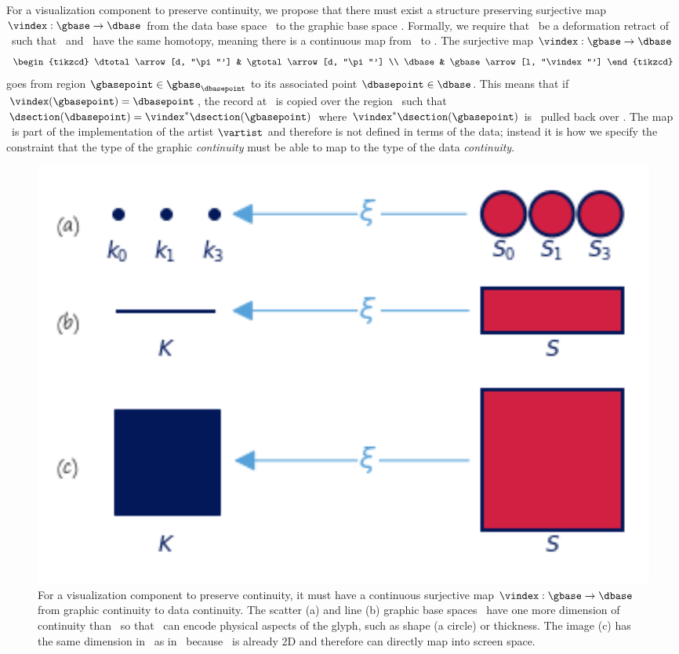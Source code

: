 \documentclass[../main.tex]{subfiles}
\begin{document}
For a visualization component to preserve continuity, we propose that there must exist a structure preserving surjective map \(\vindex: \gbase\rightarrow\dbase\) from the data base space \dbase\ to the graphic base space \gbase. Formally, we require that \dbase\ be a deformation retract \cite{RetractionTopology2020} of \gbase\ such that \dbase\ and \gbase\ have the same homotopy, meaning there is a continuous map from \gbase\ to \dbase \cite{weissteinHomotopy}. The surjective map \(\vindex: \gbase \rightarrow \dbase\)
\begin{equation}
    \begin{tikzcd}
        \dtotal \arrow[d, "\pi"'] & \gtotal \arrow[d, "\pi"'] \\
        \dbase                   & \gbase \arrow[l, "\vindex"']
    \end{tikzcd}
    \label{eq:math:graphic:vindex}
\end{equation}
goes from region \(\gbasepoint \in \gbase_{\dbasepoint}\) to its associated point \(\dbasepoint \in \dbase\). This means that if \(\vindex(\gbasepoint) = \dbasepoint\), the record at \dbasepoint\ is copied over the region \gbasepoint\ such that \(\dsection(\dbasepoint)=\vindex^*\dsection(\gbasepoint)\) where \(\vindex^*\dsection(\gbasepoint)\)  is \dsection\ pulled back over \gbase. The map \vindex\ is part of the implementation of the artist \(\mathcal{\vartist}\) and therefore is not defined in terms of the data; instead it is how we specify the constraint that the type of the graphic \textit{continuity} must be able to map to the type of the data \textit{continuity}.

\begin{figure}[H]
    \includegraphics[width=1\textwidth]{figures/math/retraction_maps.png}
    \caption{For a visualization component to preserve continuity, it must have a continuous surjective map $\vindex: \gbase\rightarrow\dbase$ from graphic continuity to data continuity. The scatter (a) and line (b) graphic base spaces \gbase\ have one more dimension of continuity than \dbase\ so that \gbase\ can encode physical aspects of the glyph, such as shape (a circle) or thickness. The image (c) has the same dimension in \gbase\ as in \dbase\ because \dbase\ is already 2D and therefore can directly map into screen space.}
    \label{fig:math:graphic:retraction:map}
\end{figure}
\end{document}
